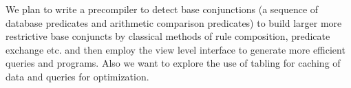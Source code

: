 
We plan to write a precompiler to detect base conjunctions (a
sequence of database predicates and arithmetic comparison predicates)
to build larger more restrictive base conjuncts by classical methods of
rule composition, predicate exchange etc. and then employ the view
level interface to generate more efficient queries and programs.
	Also we want to explore the use of tabling for caching of data
and queries for optimization.



